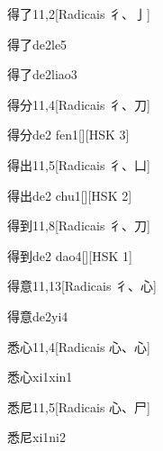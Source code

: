 \begin{entry}{得了}{11,2}[Radicais ⼻、⼅]
  \begin{phonetics}{得了}{de2le5}
  \end{phonetics}
  \begin{phonetics}{得了}{de2liao3}
  \end{phonetics}
\end{entry}

\begin{entry}{得分}{11,4}[Radicais ⼻、⼑]
  \begin{phonetics}{得分}{de2 fen1}[][HSK 3]
  \end{phonetics}
\end{entry}

\begin{entry}{得出}{11,5}[Radicais ⼻、⼐]
  \begin{phonetics}{得出}{de2 chu1}[][HSK 2]
  \end{phonetics}
\end{entry}

\begin{entry}{得到}{11,8}[Radicais ⼻、⼑]
  \begin{phonetics}{得到}{de2 dao4}[][HSK 1]
  \end{phonetics}
\end{entry}

\begin{entry}{得意}{11,13}[Radicais ⼻、⼼]
  \begin{phonetics}{得意}{de2yi4}
  \end{phonetics}
\end{entry}

\begin{entry}{悉心}{11,4}[Radicais ⼼、⼼]
  \begin{phonetics}{悉心}{xi1xin1}
  \end{phonetics}
\end{entry}

\begin{entry}{悉尼}{11,5}[Radicais ⼼、⼫]
  \begin{phonetics}{悉尼}{xi1ni2}
  \end{phonetics}
\end{entry}

